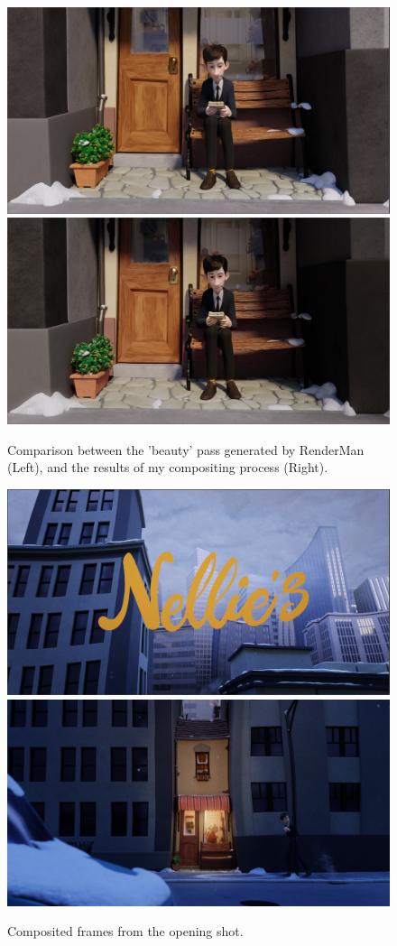 \documentclass[11pt]{article}
\begin{document}
\begin{figure}[htbp]
\newline
\newline
\includegraphics[width=0.48\linewidth]{images/shot070_precomp.png}
\hfill
\includegraphics[width=0.48\linewidth]{images/shot070_comp.png}
\caption{\label{figure:compcomparison} Comparison between the 'beauty' pass generated by RenderMan (Left), and the results of my compositing process (Right).}
\end{figure}

\begin{figure}[htbp]\centering
	\includegraphics[width=1.0\linewidth]{images/shot010_comp_02.png}
	\newline
	\newline
	\includegraphics[width=1.0\linewidth]{images/shot010_comp_01.png}
	\caption{\label{figure:shot010only} Composited frames from the opening shot.}
\end{figure}
\end{document}
